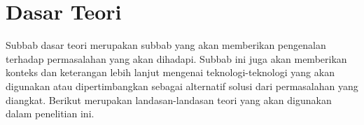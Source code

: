 \section{Dasar Teori}
\label{sec:dasar-teori}
Subbab dasar teori merupakan subbab yang akan memberikan pengenalan
terhadap permasalahan yang akan dihadapi. Subbab ini juga akan memberikan konteks dan keterangan lebih lanjut mengenai teknologi-teknologi yang akan digunakan atau dipertimbangkan sebagai alternatif solusi dari permasalahan yang diangkat. Berikut merupakan landasan-landasan teori yang akan digunakan dalam penelitian ini.













% 







